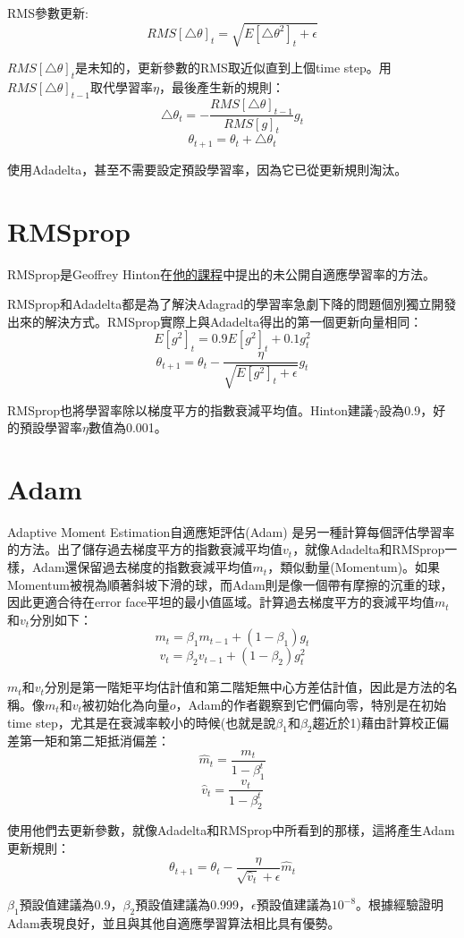 \documentclass[13pt, a4paper]{report}
\begin{document}
RMS參數更新:
$$RMS[\bigtriangleup\theta]_t=\sqrt{E[\bigtriangleup\theta^2]_t+\epsilon}$$

$RMS[\bigtriangleup\theta]_t$是未知的，更新參數的RMS取近似直到上個time step。用$RMS[\bigtriangleup\theta]_{t-1}$取代學習率$\eta$，最後產生新的規則：
$$\bigtriangleup\theta_t=-\frac{RMS[\bigtriangleup\theta]_{t-1}}{RMS[g]_t}g_t$$
$$\theta_{t+1}=\theta_t+\bigtriangleup\theta_t$$

使用Adadelta，甚至不需要設定預設學習率，因為它已從更新規則淘汰。
\section{RMSprop}
RMSprop是Geoffrey Hinton在\href{http://www.cs.toronto.edu/~tijmen/csc321/slides/lecture_slides_lec6.pdf}{他的課程}中提出的未公開自適應學習率的方法。

RMSprop和Adadelta都是為了解決Adagrad的學習率急劇下降的問題個別獨立開發出來的解決方式。RMSprop實際上與Adadelta得出的第一個更新向量相同：
$$E[g^2]_t=0.9E[g^2]_t+0.1g^2 _t$$
$$\theta_{t+1}=\theta_t-\frac{\eta}{\sqrt{E[g^2]_t+\epsilon}}g_t$$

RMSprop也將學習率除以梯度平方的指數衰減平均值。Hinton建議$\gamma$設為0.9，好的預設學習率$\eta$數值為0.001。
\section{Adam}
Adaptive Moment Estimation自適應矩評估(Adam) 是另一種計算每個評估學習率的方法。出了儲存過去梯度平方的指數衰減平均值$v_t$，就像Adadelta和RMSprop一樣，Adam還保留過去梯度的指數衰減平均值$m_t$，類似動量(Momentum)。如果Momentum被視為順著斜坡下滑的球，而Adam則是像一個帶有摩擦的沉重的球，因此更適合待在error face平坦的最小值區域。計算過去梯度平方的衰減平均值$m_t$和$v_t$分別如下：
$$m_t=\beta_1 m_{t-1}+(1-\beta_1)g_t$$
$$v_t=\beta_2 v_{t-1}+(1-\beta_2)g^2 _t$$

$m_t$和$v_t$分別是第一階矩平均估計值和第二階矩無中心方差估計值，因此是方法的名稱。像$m_t$和$v_t$被初始化為向量$o$，Adam的作者觀察到它們偏向零，特別是在初始time step，尤其是在衰減率較小的時候(也就是說$\beta_1$和$\beta_2$趨近於1)藉由計算校正偏差第一矩和第二矩抵消偏差：
$$\hat{m}_t = \dfrac{m_t}{1 - \beta^t_1} $$ 
$$\hat{v}_t = \dfrac{v_t}{1 - \beta^t_2} $$

使用他們去更新參數，就像Adadelta和RMSprop中所看到的那樣，這將產生Adam更新規則：
$$\theta_{t+1} = \theta_{t} - \dfrac{\eta}{\sqrt{\hat{v}_t} + \epsilon} \hat{m}_t$$

$\beta_1$預設值建議為0.9，$\beta_2$預設值建議為0.999，$\epsilon$預設值建議為$10^{-8}$。根據經驗證明Adam表現良好，並且與其他自適應學習算法相比具有優勢。
\end{document}
